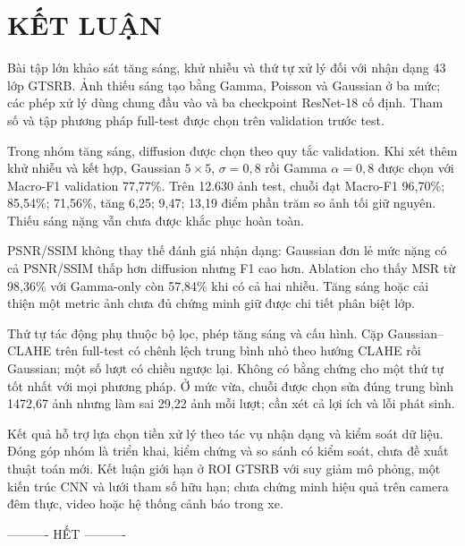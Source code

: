 \section{KẾT LUẬN}
Bài tập lớn khảo sát tăng sáng, khử nhiễu và thứ tự xử lý đối với nhận dạng 43 lớp GTSRB. Ảnh thiếu sáng tạo bằng Gamma, Poisson và Gaussian ở ba mức; các phép xử lý dùng chung đầu vào và ba checkpoint ResNet-18 cố định. Tham số và tập phương pháp full-test được chọn trên validation trước test.

Trong nhóm tăng sáng, diffusion được chọn theo quy tắc validation. Khi xét thêm khử nhiễu và kết hợp, Gaussian $5\times5$, $\sigma=0,8$ rồi Gamma $\alpha=0,8$ được chọn với Macro-F1 validation 77,77\%. Trên 12.630 ảnh test, chuỗi đạt Macro-F1 96,70\%; 85,54\%; 71,56\%, tăng 6,25; 9,47; 13,19 điểm phần trăm so ảnh tối giữ nguyên. Thiếu sáng nặng vẫn chưa được khắc phục hoàn toàn.

PSNR/SSIM không thay thế đánh giá nhận dạng: Gaussian đơn lẻ mức nặng có cả PSNR/SSIM thấp hơn diffusion nhưng F1 cao hơn. Ablation cho thấy MSR từ 98,36\% với Gamma-only còn 57,84\% khi có cả hai nhiễu. Tăng sáng hoặc cải thiện một metric ảnh chưa đủ chứng minh giữ được chi tiết phân biệt lớp.

Thứ tự tác động phụ thuộc bộ lọc, phép tăng sáng và cấu hình. Cặp Gaussian--CLAHE trên full-test có chênh lệch trung bình nhỏ theo hướng CLAHE rồi Gaussian; một số lượt có chiều ngược lại. Không có bằng chứng cho một thứ tự tốt nhất với mọi phương pháp. Ở mức vừa, chuỗi được chọn sửa đúng trung bình 1472,67 ảnh nhưng làm sai 29,22 ảnh mỗi lượt; cần xét cả lợi ích và lỗi phát sinh.

Kết quả hỗ trợ lựa chọn tiền xử lý theo tác vụ nhận dạng và kiểm soát dữ liệu. Đóng góp nhóm là triển khai, kiểm chứng và so sánh có kiểm soát, chưa đề xuất thuật toán mới. Kết luận giới hạn ở ROI GTSRB với suy giảm mô phỏng, một kiến trúc CNN và lưới tham số hữu hạn; chưa chứng minh hiệu quả trên camera đêm thực, video hoặc hệ thống cảnh báo trong xe.
\begin{center}\vspace{6mm}---------- HẾT ----------\end{center}
